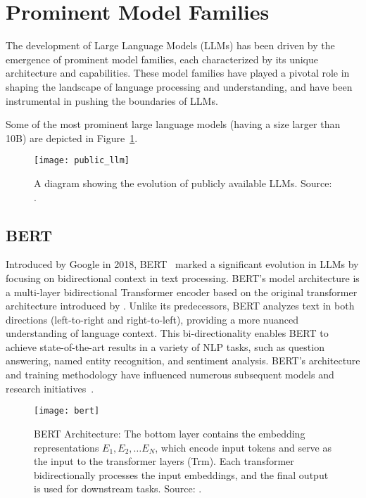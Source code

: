 \section{Prominent Model Families}
\label{sec:promiment-model-families}

The development of Large Language Models (LLMs) has been driven by the emergence of prominent model families, each characterized by its unique architecture and capabilities.
These model families have played a pivotal role in shaping the landscape of language processing and understanding, and have been instrumental in pushing the boundaries of LLMs.

Some of the most prominent large language models (having a size larger than 10B) are depicted in Figure~\ref{fig:llm-evolution}.

\begin{figure}[h!]
	\centering
	\texttt{[image: public\_llm]}
	\caption{A diagram showing the evolution of publicly available LLMs. Source: \protect\textcite{survey}.}
	\label{fig:llm-evolution}
\end{figure}

\subsection{BERT}
\label{subsec:bert}

Introduced by Google in 2018, BERT~\cite{devlin2019bert} marked a significant evolution in LLMs by focusing on bidirectional context in text processing.
BERT’s model architecture is a multi-layer bidirectional Transformer encoder based on the original transformer architecture introduced by \textcite{vaswani2023attention}.
Unlike its predecessors, BERT analyzes text in both directions (left-to-right and right-to-left), providing a more nuanced understanding of language context.
This bi-directionality enables BERT to achieve state-of-the-art results in a variety of NLP tasks, such as question answering, named entity recognition, and sentiment analysis.
BERT's architecture and training methodology have influenced numerous subsequent models and research initiatives~\cite{devlin2019bert}.

\begin{figure}[h!]
	\centering
	\texttt{[image: bert]}
	\caption{BERT Architecture: The bottom layer contains the embedding representations \(E_1, E_2, \ldots E_N\), which encode input tokens and serve as the input to the transformer layers (Trm).
		Each transformer bidirectionally processes the input embeddings, and the final output is used for downstream tasks. Source: \protect\textcite{devlin2019bert}.}
	\label{fig:bert-arch}
\end{figure}

